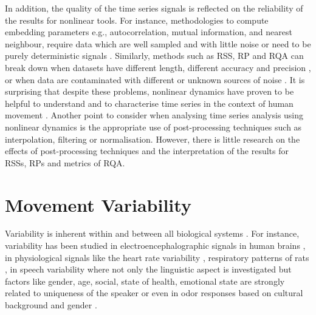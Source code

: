 In addition, the quality of the time series signals is reflected on 
the reliability of the results for nonlinear tools. For instance, 
methodologies to compute embedding 
parameters e.g., autocorrelation, mutual information, and nearest neighbour,
require data which are well sampled and with little noise \citep{garland2016} 
or need to be purely deterministic signals \citep{kantz2003}.
Similarly, methods such as RSS, RP and RQA can break down when 
datasets have different length, different accuracy and 
precision \citep{frank2010},
or when data are contaminated with different or unknown sources of noise 
\citep{garland2016}. It is surprising that despite these problems,
nonlinear dynamics have proven to be helpful to understand and 
to characterise time series in the context of human movement 
\citep{Quintana-Duque2012, Quintana-Duque2016, sama2013, frank2010,
gomezgarcia2014, marwan2011, stergiou2011, bradley2015}.
Another point to consider when analysing time series analysis using 
nonlinear dynamics is the appropriate use of post-processing techniques 
such as interpolation, filtering or normalisation.
However, there is little research on the effects of post-processing 
techniques and the interpretation of the results for RSSs, RPs and 
metrics of RQA.

%






\section{Movement Variability}
Variability is inherent within and between all biological 
systems \citep{newell1993}.
For instance, variability has been studied in electroencephalographic 
signals in human brains \citep{klonowski2007}, in physiological signals 
like the heart rate variability \citep{schumacher2004, acharya2006}, 
respiratory patterns of rats \citep{dhingra2011}, in speech variability 
where not only the linguistic aspect is investigated but 
factors like gender, age, social, state of health, emotional state are
strongly related to uniqueness of the speaker \citep{benzeghiba2007}
or even in odor responses based on cultural background and 
gender \citep{ferdenzi2013}.

